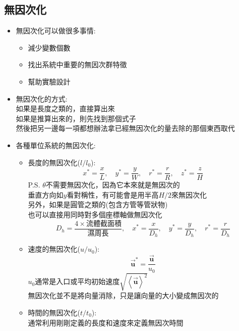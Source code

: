 \documentclass[../main.tex]{subfiles}
\begin{document}
\subsection{無因次化}
\begin{itemize}
  \item  無因次化可以做很多事情:
  \begin{itemize}
    \item 減少變數個數
    \item 找出系統中重要的無因次群特徵
    \item 幫助實驗設計
  \end{itemize}
  \item 無因次化的方式:\\
    如果是長度之類的，直接算出來\\
    如果是推算出來的，則先找到那個式子\\
    然後把另一邊每一項都想辦法拿已經無因次化的量去除的那個東西取代
  \item 各種單位系統的無因次化:
  \begin{itemize}
    \item 長度的無因次化($l/l_0$):
    \begin{equation}
      x^\ast = \frac{x}{L}, \quad y^\ast = \frac{y}{W}, \quad r^\ast = \frac{r}{R}, \quad z^\ast = \frac{z}{H}
    \end{equation}
    P.S. $\theta$不需要無因次化，因為它本來就是無因次的\\
    垂直方向如$y$看對稱性，有可能會是用半高$H/2$來無因次化\\
    另外，如果是圓管之類的(包含方管等管狀物)\\
    也可以直接用同時對多個座標軸做無因次化
    \begin{equation}
      D_h = \frac{4 \times \text{流體截面積}}{\text{濕周長}},
      \quad x^\ast = \frac{x}{D_h}, \quad y^\ast = \frac{y}{D_h}, \quad r^\ast = \frac{r}{D_h}
    \end{equation}
    \item 速度的無因次化($u/u_0$):
    \begin{equation}
      \vec {\bm u}^\ast = \frac{\vec {\bm u}}{u_0}
    \end{equation}
    $u_0$通常是入口或平均初始速度$\sqrt{\left<\vec {\bm u}\right>^2}$\\
    無因次化並不是將向量消除，只是讓向量的大小變成無因次的
    \item 時間的無因次化($t/t_0$):\\
    通常利用剛剛定義的長度和速度來定義無因次時間
    \begin{equation}

\end{equation}
\end{itemize}
\end{itemize}
\end{document}
